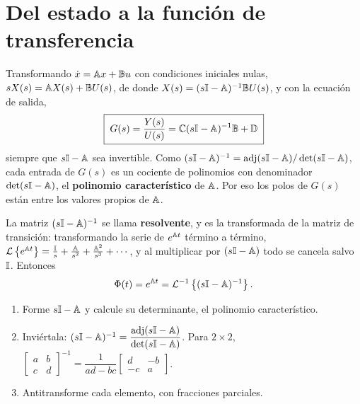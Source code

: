 \section{Del estado a la función de transferencia}
\label{sec:ee-estado-ft}

Transformando $\dot x=\mathbb{A} x+\mathbb{B} u$ con condiciones iniciales nulas, $sX(s)=\mathbb{A} X(s)+\mathbb{B} U(s)$, de donde $X(s)=(s\mathbb{I}-\mathbb{A})^{-1}\mathbb{B} U(s)$, y con la ecuación de salida,
\begin{equation}
  \boxed{\;G(s)=\frac{Y(s)}{U(s)}=\mathbb{C}(s\mathbb{I}-\mathbb{A})^{-1}\mathbb{B}+\mathbb{D}\;}
  \label{eq:ee-ss2tf}
\end{equation}
siempre que $s\mathbb{I}-\mathbb{A}$ sea invertible. Como $(s\mathbb{I}-\mathbb{A})^{-1}=\operatorname{adj}(s\mathbb{I}-\mathbb{A})/\det(s\mathbb{I}-\mathbb{A})$, cada entrada de $G(s)$ es un cociente de polinomios con denominador $\det(s\mathbb{I}-\mathbb{A})$, el \textbf{polinomio característico} de $\mathbb{A}$. Por eso los polos de $G(s)$ están entre los valores propios de $\mathbb{A}$.

La matriz $(s\mathbb{I}-\mathbb{A})^{-1}$ se llama \textbf{resolvente}, y es la transformada de la matriz de transición: transformando la serie de $e^{\mathbb{A} t}$ término a término, $\mathcal{L}\left\{e^{\mathbb{A} t}\right\}=\frac{\mathbb{I}}{s}+\frac{\mathbb{A}}{s^2}+\frac{\mathbb{A}^2}{s^3}+\cdots$, y al multiplicar por $(s\mathbb{I}-\mathbb{A})$ todo se cancela salvo $\mathbb{I}$. Entonces
\begin{equation}
  \Phi(t)=e^{\mathbb{A} t}=\mathcal{L}^{-1}\left\{(s\mathbb{I}-\mathbb{A})^{-1}\right\} .
  \label{eq:ee-resolvente}
\end{equation}

\begin{receta}
\begin{enumerate}
  \item Forme $s\mathbb{I}-\mathbb{A}$ y calcule su determinante, el polinomio característico.
  \item Inviértala: $(s\mathbb{I}-\mathbb{A})^{-1}=\dfrac{\operatorname{adj}(s\mathbb{I}-\mathbb{A})}{\det(s\mathbb{I}-\mathbb{A})}$. Para $2\times2$, $\begin{bmatrix}a&b\\c&d\end{bmatrix}^{-1}=\dfrac{1}{ad-bc}\begin{bmatrix}d&-b\\-c&a\end{bmatrix}$.
  \item Antitransforme cada elemento, con fracciones parciales.
\end{enumerate}
\end{receta}

